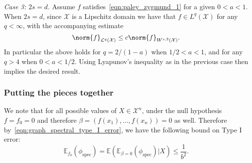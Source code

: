 \documentclass{article}
\newcommand{\1}{\mathbf{1}}
\newcommand{\Xset}{\mathcal{X}}
\newcommand{\Leb}{\mathcal{L}}
\newcommand{\Ebb}{\mathbb{E}}
\newcommand{\spec}{\mathrm{spec}}
\theoremstyle{alden}
\theoremstyle{aldenthm}
\theoremstyle{definition}
\theoremstyle{remark}
\begin{document}
\textit{Case 3: $2s = d$.}
Assume $f$ satisfies~\eqref{eqn:paley_zygmund_1} for a given $0 < a < 1$. When $2s = d$, since $\Xset$ is a Lipschitz domain we have that $f \in L^q(\Xset)$ for any $q < \infty$, with the accompanying estimate
\begin{equation*}
\norm{f}_{\Leb^q(\Xset)} \leq c \norm{f}_{W^{s,2}(\Xset)}.
\end{equation*}
In particular the above holds for $q = 2/(1 - a)$ when $1/2 < a < 1$, and for any $q > 4$ when $0 < a < 1/2$. Using Lyapunov's inequality as in the previous case then implies the desired result.

\subsubsection{Putting the pieces together}
\label{subsubsec:sobolev_testing_rate_pf_conclusion}

We note that for all possible values of $X \in \Xset^n$, under the null hypothesis $f = f_0 = 0$ and therefore $\beta = (f(x_1),\ldots,f(x_n)) = 0$ as well. Therefore by~\eqref{eqn:graph_spectral_type_I_error}, we have the following bound on Type I error:
\begin{equation}
\Ebb_{f_0}(\phi_{\mathrm{spec}}) = \mathbb{E}(\mathbb{E}_{\beta = 0}(\phi_{\spec}) | X) \leq \frac{1}{b^2}.
\end{equation}
\end{document}
